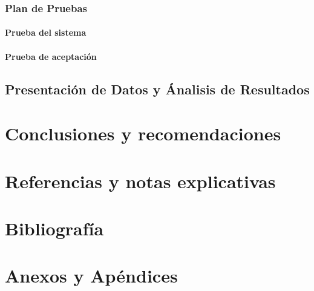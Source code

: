 \documentclass[letterpaper,openright,10pt,twoside]{report}
\begin{document}
		\section{Plan de Pruebas}
			\subsection{Prueba del sistema}
			\subsection{Prueba de aceptación}
	\chapter{Presentación de Datos y Ánalisis de Resultados}
\part{Conclusiones y recomendaciones}
\part{Referencias y notas explicativas}
\part{Bibliografía}
\part{Anexos y Apéndices}
\end{document}

